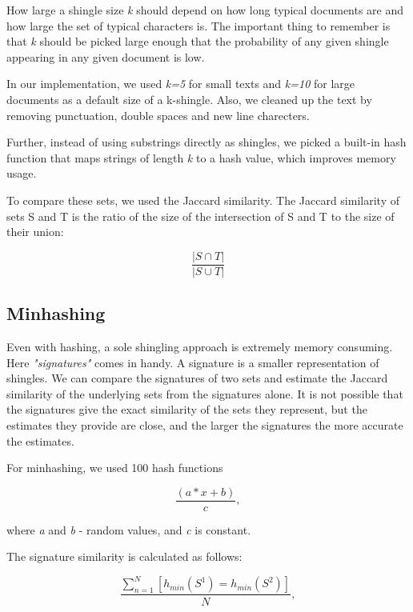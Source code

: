 \documentclass[a4paper, 11pt]{article}
\begin{document}
How large a shingle size \textit{k} should depend on how long typical documents are and how large the set of typical characters is. The important thing to remember is that \textit{k} should be picked large enough that the probability of any given shingle appearing in any given document is low.

In our implementation, we used  \textit{k=5} for small texts and \textit{k=10}  for large documents as a default size of a k-shingle. Also, we cleaned up the text by removing punctuation, double spaces and new line charecters.

Further, instead of using substrings directly as shingles, we picked a built-in hash function that maps strings of length \textit{k} to a hash value, which improves memory usage.

To compare these sets, we used the Jaccard similarity. The Jaccard similarity of sets S and T is the ratio of the size of the intersection of S and T to the size of their union:

\begin{equation}
\frac{|S \cap T|}{|S \cup T|}
\end{equation}

\subsection{Minhashing}

Even with hashing, a sole shingling approach is extremely memory consuming. Here \textit{"signatures"} comes in handy. A signature is a smaller representation of shingles. We can compare the signatures of two sets and estimate the Jaccard similarity of the underlying sets from the signatures alone. It is not possible that the signatures give the exact similarity of the sets they represent, but the estimates they provide are close, and the larger the signatures the more accurate the estimates.

For minhashing, we used 100 hash functions

\begin{equation}
\frac{(a * x + b)}{c}, 
\end{equation}

where \textit{a} and \textit{b} - random values, and \textit{c} is constant.

The signature similarity is calculated as follows:

\begin{equation}
\frac{\sum_{n=1}^{N}[h_{min}(S^{1}) = h_{min}(S^{2})]}{N}, 
\end{equation}
\end{document}
